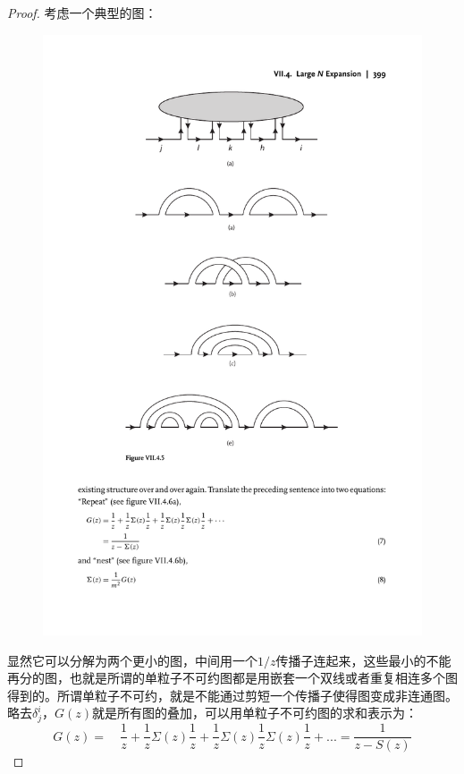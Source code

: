 \begin{proof}
	考虑一个典型的图：
	\begin{figure}[H]
		\centering
		\includegraphics{figs/fig10.pdf}
	\end{figure}
	显然它可以分解为两个更小的图，中间用一个$1/z$传播子连起来，这些最小的不能再分的图，也就是所谓的单粒子不可约图都是用嵌套一个双线或者重复相连多个图得到的。所谓单粒子不可约，就是不能通过剪短一个传播子使得图变成非连通图。略去$\delta^i_j$，$G(z)$就是所有图的叠加，可以用单粒子不可约图的求和表示为：
	\begin{equation}
			G(z)=\quad\frac1z+\frac1z\Sigma(z)\frac1z+\frac1z\Sigma(z)\frac1z\Sigma(z)\frac1z+...
			=\frac1{z-S(z)}
	\end{equation}

\end{proof}

